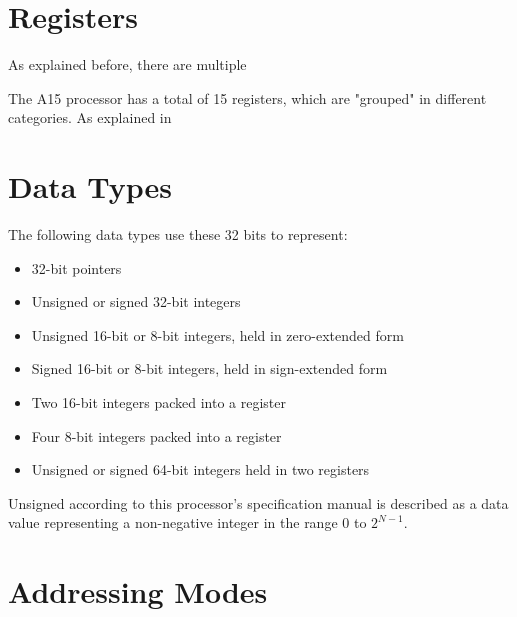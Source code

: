 \documentclass[12pt]{scrreprt}
\begin{document}
{\let\clearpage\relax\chapter{Registers}}

	As explained before, there are multiple 

	The A15 processor has a total of 15 registers, which are "grouped" in different categories. As explained in 




{\let\clearpage\relax\chapter{Data Types}}


	The following data types use these 32 bits to represent:

	\begin{itemize}
		\item{32-bit pointers}
		\item{Unsigned or signed 32-bit integers}
		\item{Unsigned 16-bit or 8-bit integers, held in zero-extended form}
		\item{Signed 16-bit or 8-bit integers, held in sign-extended form}
		\item{Two 16-bit integers packed into a register}
		\item{Four 8-bit integers packed into a register}
		\item{Unsigned or signed 64-bit integers held in two registers}
	\end{itemize}

	Unsigned according to this processor's specification manual is described as a data value representing a non-negative integer in the
	range $0$ to $2^{N-1}$.

{\let\clearpage\relax\chapter{Addressing Modes}}
\end{document}
